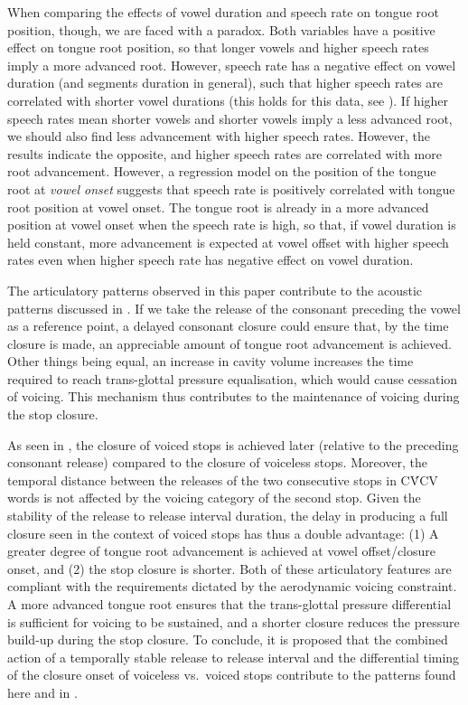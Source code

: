 \documentclass[12pt,]{article}
\begin{document}
When comparing the effects of vowel duration and speech rate on tongue
root position, though, we are faced with a paradox. Both variables have
a positive effect on tongue root position, so that longer vowels and
higher speech rates imply a more advanced root. However, speech rate has
a negative effect on vowel duration (and segments duration in general),
such that higher speech rates are correlated with shorter vowel
durations (this holds for this data, see \citealt{coretta2018j}). If
higher speech rates mean shorter vowels and shorter vowels imply a less
advanced root, we should also find less advancement with higher speech
rates. However, the results indicate the opposite, and higher speech
rates are correlated with more root advancement. However, a regression
model on the position of the tongue root at \emph{vowel onset} suggests
that speech rate is positively correlated with tongue root position at
vowel onset. The tongue root is already in a more advanced position at
vowel onset when the speech rate is high, so that, if vowel duration is
held constant, more advancement is expected at vowel offset with higher
speech rates even when higher speech rate has negative effect on vowel
duration.

The articulatory patterns observed in this paper contribute to the
acoustic patterns discussed in \citet{coretta2018j}. If we take the
release of the consonant preceding the vowel as a reference point, a
delayed consonant closure could ensure that, by the time closure is
made, an appreciable amount of tongue root advancement is achieved.
Other things being equal, an increase in cavity volume increases the
time required to reach trans-glottal pressure equalisation, which would
cause cessation of voicing. This mechanism thus contributes to the
maintenance of voicing during the stop closure.

As seen in \citet{coretta2018j}, the closure of voiced stops is achieved
later (relative to the preceding consonant release) compared to the
closure of voiceless stops. Moreover, the temporal distance between the
releases of the two consecutive stops in CV́CV words is not affected by
the voicing category of the second stop. Given the stability of the
release to release interval duration, the delay in producing a full
closure seen in the context of voiced stops has thus a double advantage:
(1) A greater degree of tongue root advancement is achieved at vowel
offset/closure onset, and (2) the stop closure is shorter. Both of these
articulatory features are compliant with the requirements dictated by
the aerodynamic voicing constraint. A more advanced tongue root ensures
that the trans-glottal pressure differential is sufficient for voicing
to be sustained, and a shorter closure reduces the pressure build-up
during the stop closure. To conclude, it is proposed that the combined
action of a temporally stable release to release interval and the
differential timing of the closure onset of voiceless vs.~voiced stops
contribute to the patterns found here and in \citet{coretta2018j}.
\end{document}
